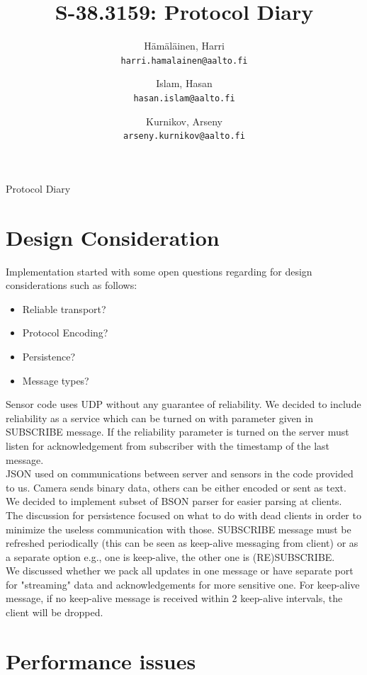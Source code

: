 \documentclass[11pt,a4paper]{report}
\author{Hämäläinen, Harri \\
\texttt{harri.hamalainen@aalto.fi}
\and
Islam, Hasan \\
\texttt{hasan.islam@aalto.fi}
\and
Kurnikov, Arseny \\
\texttt{arseny.kurnikov@aalto.fi}}
\title{S-38.3159: Protocol Diary}
\begin{document}
\maketitle
 
\begin{center}
 \huge{Protocol Diary}
\end{center}

\section*{Design Consideration}

 Implementation started with some open questions regarding for design considerations such as follows:
 
  \begin{itemize}
   \item Reliable transport?
   \item Protocol Encoding?
   \item Persistence?
   \item Message types?
  \end{itemize}

Sensor code uses UDP without any guarantee of reliability. We decided to include reliability as a service which can be turned on with parameter given in SUBSCRIBE message. If the reliability parameter is turned on the server must listen for acknowledgement from subscriber with the timestamp of the last message.\\

JSON used on communications between server and sensors in the code provided to us. Camera sends binary data, others can be either encoded or sent as text. We decided to implement subset of BSON parser for easier parsing at clients. \\

The discussion for persistence focused on what to do with dead clients in order to minimize the useless communication with those. SUBSCRIBE message must be refreshed periodically (this can be seen as keep-alive messaging from client) or as a separate option e.g., one is keep-alive, the other one is (RE)SUBSCRIBE. \\

We discussed whether we pack all updates in one message or have separate port for "streaming" data and acknowledgements for more sensitive one. For keep-alive message, if no keep-alive message is received within 2 keep-alive intervals, the client will be dropped.

\section*{Performance issues}
\end{document}
